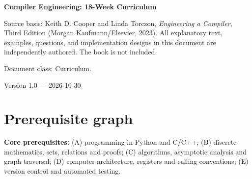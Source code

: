 \documentclass[10pt,letterpaper]{article}
\begin{document}
\begin{titlepage}
\centering\vspace*{1.0in}
{\Huge\bfseries\textcolor{CompilerBlue}{Compiler Engineering: 18-Week Curriculum}\par}
\vspace{.22in}{\Large Prerequisite graph, source reading and staged deliverables\par}
\vspace{.4in}{\large Compiler Engineering Documentation Suite\par}
\vfill
\begin{minipage}{.86\linewidth}\small
Source basis: Keith D. Cooper and Linda Torczon, \emph{Engineering a Compiler}, Third Edition (Morgan Kaufmann/Elsevier, 2023). All explanatory text, examples, questions, and implementation designs in this document are independently authored. The book is not included.\par\medskip
Document class: Curriculum.
\end{minipage}
\vfill\textcolor{CompilerGray}{Version 1.0 --- 2026-10-30}\par
\end{titlepage}
\tableofcontents\clearpage
\section{Prerequisite graph}
\textbf{Core prerequisites:} (A) programming in Python and C/C++; (B) discrete mathematics, sets, relations and proofs; (C) algorithms, asymptotic analysis and graph traversal; (D) computer architecture, registers and calling conventions; (E) version control and automated testing.
\begin{center}\end{center}
\end{document}
